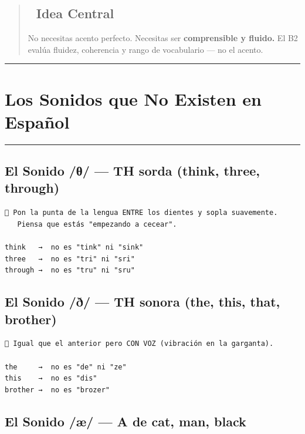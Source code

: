 \documentclass[
  spanish,
  letterpaper,
]{scrbook}
\begin{document}
\begin{quote}
\subsection{🎯 Idea Central}\label{idea-central-20}

No necesitas acento perfecto. Necesitas ser \textbf{comprensible y
fluido.} El B2 evalúa fluidez, coherencia y rango de vocabulario --- no
el acento.
\end{quote}

\begin{center}\rule{0.5\linewidth}{0.5pt}\end{center}

\section{Los Sonidos que No Existen en
Español}\label{los-sonidos-que-no-existen-en-espauxf1ol}

\begin{center}\rule{0.5\linewidth}{0.5pt}\end{center}

\subsection{El Sonido /θ/ --- TH sorda (think, three,
through)}\label{el-sonido-ux3b8-th-sorda-think-three-through}

\begin{verbatim}
🧠 Pon la punta de la lengua ENTRE los dientes y sopla suavemente.
   Piensa que estás "empezando a cecear".

think   →  no es "tink" ni "sink"
three   →  no es "tri" ni "sri"
through →  no es "tru" ni "sru"
\end{verbatim}

\subsection{El Sonido /ð/ --- TH sonora (the, this, that,
brother)}\label{el-sonido-uxf0-th-sonora-the-this-that-brother}

\begin{verbatim}
🧠 Igual que el anterior pero CON VOZ (vibración en la garganta).

the     →  no es "de" ni "ze"
this    →  no es "dis"
brother →  no es "brozer"
\end{verbatim}

\subsection{El Sonido /æ/ --- A de cat, man,
black}\label{el-sonido-uxe6-a-de-cat-man-black}
\end{document}
